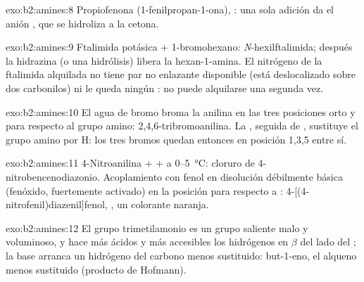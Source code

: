 \begin{solution}{exo:b2:amines:8}
Propiofenona (1-fenilpropan-1-ona), : una sola adición da el anión ,
que se hidroliza a la cetona.
\end{solution}

\begin{solution}{exo:b2:amines:9}
Ftalimida potásica + 1-bromohexano: \textit{N}-hexilftalimida; después la hidrazina (o una hidrólisis)
libera la hexan-1-amina. El nitrógeno de la ftalimida alquilada no tiene par no enlazante disponible (está
deslocalizado sobre dos carbonilos) ni le queda ningún : no puede alquilarse una segunda vez.
\end{solution}

\begin{solution}{exo:b2:amines:10}
El agua de bromo broma la anilina en las tres posiciones orto y para respecto al grupo
amino: 2,4,6-tribromoanilina. La , seguida de , sustituye el grupo amino por H: los tres
bromos quedan entonces en posición 1,3,5 entre sí.
\end{solution}

\begin{solution}{exo:b2:amines:11}
4-Nitroanilina +  +  a 0--\qty{5}{\degreeCelsius}: cloruro de
4-nitrobencenodiazonio. Acoplamiento con fenol en disolución débilmente básica (fenóxido, fuertemente activado) en la
posición para respecto a : 4-[(4-nitrofenil)diazenil]fenol, , un colorante
naranja.
\end{solution}

\begin{solution}{exo:b2:amines:12}
El grupo trimetilamonio es un grupo saliente malo y voluminoso, y hace más ácidos y más accesibles los hidrógenos en $\beta$ del
lado del ; la base arranca un hidrógeno del carbono menos
sustituido: but-1-eno, el alqueno menos sustituido (producto de Hofmann).
\end{solution}

